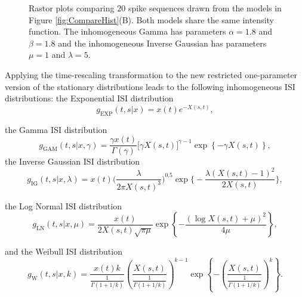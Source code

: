 \documentclass[oneside, 12 pt]{book}
\begin{document}
   \begin{figure}[t!]
   \begin{center} 
    \caption{Rastor plots comparing $20$ spike sequences drawn from the models in Figure \ref{fig:CompareHist}(B). Both models share the same intensity function. The inhomogeneous Gamma has parameters $\alpha = 1.8$ and $\beta = 1.8$ and the inhomogeneous Inverse Gaussian has parameters $\mu=1$ and $\lambda = 5$.} 
      \label{fig:Rasta}
    \end{center} 
    \end{figure}
    
Applying the time-rescaling transformation to the new restricted one-parameter version of the stationary distributions leads to the following inhomogeneous ISI distributions: the Exponential ISI distribution
$$
 g_{\mathrm{EXP}}(t,s|x) = x(t) e^{-X(s,t)},
 $$

the Gamma ISI distribution
$$
 g_{\mathrm{GAM}}(t,s| x, \gamma) =  \frac{\gamma x(t)}{\Gamma ( \gamma )} \big[ \gamma X(s,t) \big]^{\gamma -1} \exp \left\{ - \gamma X(s,t)  \right\},
$$
 the Inverse Gaussian ISI distribution
 $$
  g_{\mathrm{IG}}(t,s| x,\lambda) =  x(t) \bigg( \frac{\lambda}{2\pi X(s,t)^3} \bigg)^{0.5} \exp \bigg\{-\frac{\lambda(X(s,t)-1)^2}{2 X(s,t)} \bigg\},
 $$
 
 the Log Normal ISI distribution
 $$
  g_{\mathrm{LN}}(t,s| x, \mu ) = \frac{x(t)}{2 X(s,t) \sqrt{\pi \mu}} \exp \left\{ -\frac{(\log X(s,t) + \mu)^2}{4\mu} \right\},
 $$
  
 and the Weibull ISI distribution
$$
 g_{\mathrm{W}}(t,s|x,k) = \frac{x(t)k}{\frac{1}{\Gamma(1+1/k)}} \left( \frac{X(s,t)}{\frac{1}{\Gamma(1+1/k)}} \right)^{k-1} \exp \left\{ -\left( \frac{X(s,t)}{\frac{1}{\Gamma(1+1/k)}} \right)^k \right\}.
 $$
\end{document}
